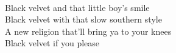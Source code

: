 \\
	Black velvet and that little boy's smile \\
	Black velvet with that slow southern style \\
	A new religion that'll bring ya to your knees \\
	Black velvet if you please \\
